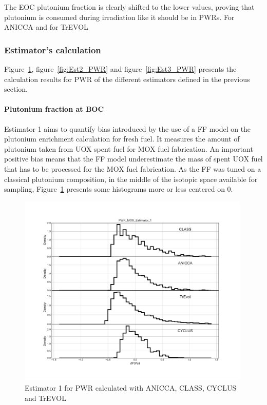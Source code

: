 The EOC plutonium fraction is clearly shifted to the lower values, proving that plutonium is consumed during irradiation like it should be in PWRs. For ANICCA and for TrEVOL    

\subsubsection{Estimator's calculation}

Figure~\ref{fig:Est1_PWR}, figure~\ref{fig:Est2_PWR} and figure~\ref{fig:Est3_PWR} presents the calculation results for PWR of the different estimators defined in the previous section. 

\paragraph{Plutonium fraction at BOC}
Estimator 1 aims to quantify bias introduced by the use of a FF model on the plutonium enrichment calculation for fresh fuel. It measures the amount of plutonium taken from UOX spent fuel for MOX fuel fabrication. An important positive bias means that the FF model underestimate the mass of spent UOX fuel that has to be processed for the MOX fuel fabrication. As the FF was tuned on a classical plutonium composition, in the middle of the isotopic space available for sampling, Figure~\ref{fig:Est1_PWR} presents some histograms more or less centered on 0.


\begin{figure}[h]
	\begin{center}
		\includegraphics[width = 0.99\textwidth]{../../Feature_1/RAW_DATA/FIG/PWR_MOX_Estimator_1.pdf}
		\caption{Estimator 1 for PWR calculated with ANICCA, CLASS, CYCLUS and TrEVOL}
		\label{fig:Est1_PWR}
	\end{center}
\end{figure}

